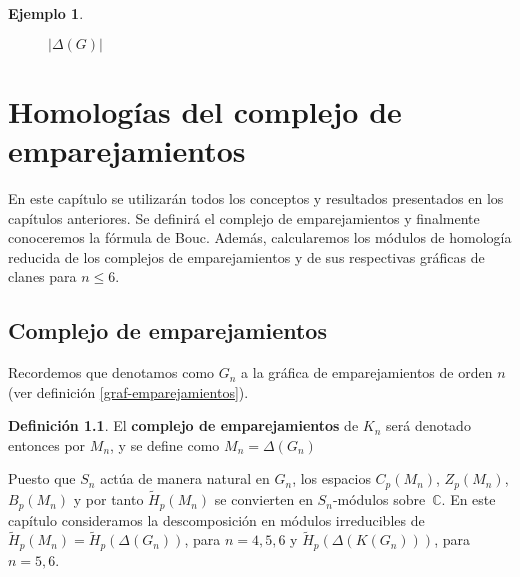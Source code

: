 \documentclass[12pt]{book}
\theoremstyle{definition}
\newtheorem{definition}[theorem]{Definición}
\newtheorem{example}[theorem]{Ejemplo}
\newcounter{in}
\newcounter{ini}
\begin{document}
\begin{example}
\begin{center}
\begin{figure}[h]
\begin{minipage}[h]{0.45\linewidth}
        \caption{$|\Delta(G)|$}
        \label{fig:realizacion-geometrica}
      \end{minipage}
    \end{figure}
  \end{center}
\end{example}

\chapter[Homologías de $M_{n}$ y $K(M_{n})$]{Homologías del complejo de emparejamientos}
\label{cha:hom-com-emp}

En este capítulo se utilizarán todos los conceptos y resultados
presentados en los capítulos anteriores. Se definirá el complejo de
emparejamientos y finalmente conoceremos la
fórmula de Bouc. Además, calcularemos los módulos de homología reducida de los
complejos de emparejamientos y de sus respectivas gráficas de clanes para
$n\leq 6$.

\section{Complejo de emparejamientos}
\label{complejo-emparejamientos}

Recordemos que denotamos como $G_{n}$ a la gráfica de
emparejamientos de orden $n$ (ver definición \ref{graf-emparejamientos}).

\begin{definition}
El \textbf{complejo de emparejamientos} de $K_{n}$ será denotado
entonces por $M_{n}$, y se define como $M_{n}=\Delta(G_{n})$
\end{definition}

Puesto que $S_{n}$ actúa de manera
natural en $G_{n}$, los espacios $C_{p}(M_{n})$, $Z_{p}(M_{n})$,
$B_{p}(M_{n})$ y por tanto $\widetilde H_{p}(M_{n})$ se convierten en
$S_{n}$-módulos sobre~$\mathbb{C}$. En este capítulo consideramos
la descomposición en módulos irreducibles de
$\widetilde H_{p}(M_{n})=\widetilde H_{p}(\Delta(G_{n}))$, para
$n=4,5,6$ y $\widetilde H_{p}(\Delta(K(G_{n})))$, para $n=5,6$.
\end{document}
